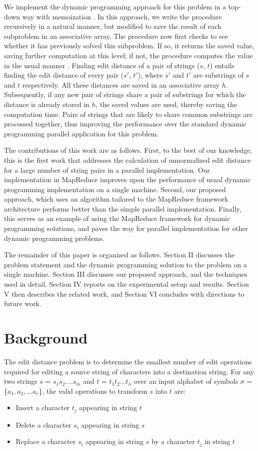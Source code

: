 \documentclass[conference]{IEEEtran}
\begin{document}
We implement the dynamic programming approach for this problem in a top-down way with memoization \cite{Cormen}. In this approach, we write the procedure recursively in a natural manner, but modified to save the result of each subproblem in an associative array. The procedure now first checks to see whether it has previously solved this subproblem. If so, it returns the saved value, saving further computation at this level; if not, the procedure computes the value in the usual manner \cite{Cormen}. Finding edit distance of a pair of strings ($s$, $t$) entails finding the edit distance of every pair ($s'$, $t'$), where $s'$ and $t'$ are substrings of $s$ and $t$ respectively. All these distances are saved in an associative array $h$. Subsequently, if any new pair of strings share a pair of substrings for which the distance is already stored in $h$, the saved values are used, thereby saving the computation time. Pairs of strings that are likely to share common substrings are processed together, thus improving the performance over the standard dynamic programming parallel application for this problem.

The contributions of this work are as follows. First, to the best of our knowledge, this is the first work that addresses the calculation of unnormalized edit distance for a large number of string pairs in a parallel implementation. Our implementation in MapReduce improves upon the performance of usual dynamic programming implementation on a single machine. Second, our proposed approach, which uses an algorithm tailored to the MapReduce framework architecture performs better than the simple parallel implementation. Finally, this serves as an example of using the MapReduce framework for dynamic programming solutions, and paves the way for parallel implementation for other dynamic programming problems.

The remainder of this paper is organized as follows. Section II discusses the problem statement and the dynamic programming solution to the problem on a single machine. Section III discusses our proposed approach, and the techniques used in detail. Section IV reports on the experimental setup and results. Section V then describes the related work, and Section VI concludes with directions to future work.

\section{Background}
The edit distance problem is to determine the smallest number of edit operations required for editing a source string of characters into a destination string. For any two strings $s$ = $s_1s_2....s_m$ and $t$ = $t_1t_2...t_n$ over an input alphabet of symbols $\sigma$ = \{$a_1, a_2,...a_r$\}, the valid operations to transform $s$ into $t$ are:
\begin{itemize}
\item Insert a character $t_j$ appearing in string $t$
\item Delete a character $s_i$ appearing in string $s$
\item Replace a character $s_i$ appearing in string $s$ by a character $t_j$ in string $t$
\end{itemize}
\end{document}

